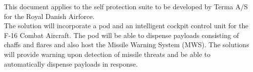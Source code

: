 This document applies to the self protection suite to be developed by Terma A/S for the Royal Danish Airforce.\\
The solution will incorporate a pod and an intelligent cockpit control unit for the F-16 Combat Aircraft. The pod will be able to dispense payloads consisting of chaffs and flares and also host the Missile Warning System (MWS). The solutions will provide warning upon detection of missile threats and be able to automatically dispense payloads in response.
